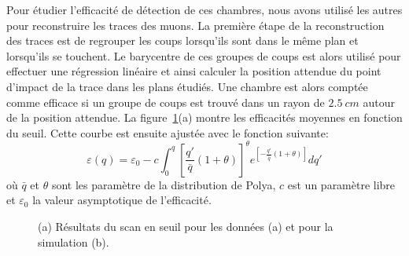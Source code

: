 Pour étudier l'efficacité de détection de ces chambres, nous avons utilisé les autres pour reconstruire les traces des muons. La première étape de la reconstruction des traces est de regrouper les coups lorsqu'ils sont dans le même plan et lorsqu'ils se touchent. 
Le barycentre de ces groupes de coups est alors utilisé pour effectuer une régression linéaire et ainsi calculer la position attendue du point d'impact de la trace dans les plans étudiés. Une chambre est alors comptée comme efficace si un groupe de coups est trouvé dans un rayon de $2.5~cm$ autour de la position attendue. La figure~\ref{fig.thrScan}(a) montre les efficacités moyennes en fonction du seuil. 
Cette courbe est ensuite ajustée avec le fonction suivante:
\begin{equation}
  \label{eq.fitScan}
  \varepsilon(q)=\varepsilon _0 - c\int_0^q{[\frac{q'}{\bar q}(1+\theta)]^{\theta}e^{[-\frac{q'}{\bar q}(1+\theta)]}dq'}
\end{equation}
où $\bar q$ et $\theta$ sont les paramètre de la distribution de Polya, $c$ est un paramètre libre et $\varepsilon_0$ la valeur asymptotique de l'efficacité.
\begin{figure}[!ht]
  \caption{(a) Résultats du scan en seuil pour les données (a) et pour la simulation (b). \label{fig.thrScan}}
\end{figure}
